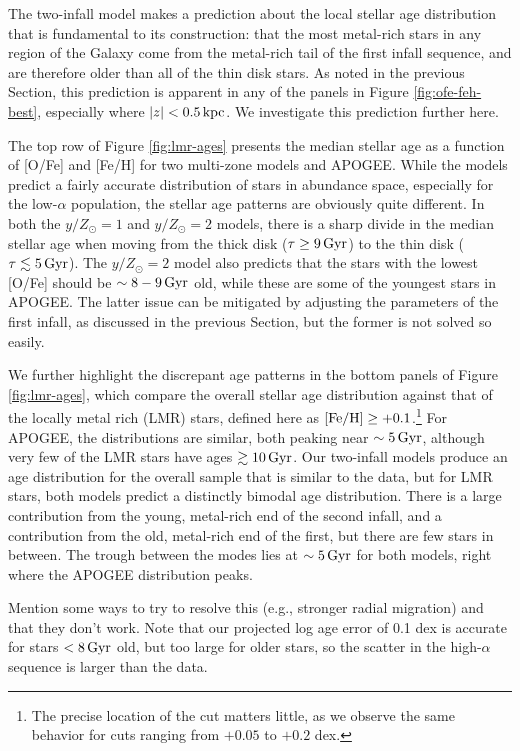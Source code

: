 \documentclass[twocolumn,twocolappendix,linenumbers]{aastex631}
\newcommand{\todo}[1]{{\color{red}#1}}
\newcommand{\mathFeH}{{\rm [Fe/H]}}
\newcommand{\yZ}[1]{$y/Z_\odot=#1$}
\newcommand{\kpc}{\,{\rm kpc}}
\newcommand{\Gyr}{\,{\rm Gyr}}
\begin{document}
The two-infall model makes a prediction about the local stellar age distribution that is fundamental to its construction: that the most metal-rich stars in any region of the Galaxy come from the metal-rich tail of the first infall sequence, and are therefore older than all of the thin disk stars. As noted in the previous Section, this prediction is apparent in any of the panels in Figure \ref{fig:ofe-feh-best}, especially where $|z|<0.5\kpc$. We investigate this prediction further here.

The top row of Figure \ref{fig:lmr-ages} presents the median stellar age as a function of [O/Fe] and [Fe/H] for two multi-zone models and APOGEE. While the models predict a fairly accurate distribution of stars in abundance space, especially for the low-$\alpha$ population, the stellar age patterns are obviously quite different. In both the \yZ{1} and \yZ{2} models, there is a sharp divide in the median stellar age when moving from the thick disk ($\tau\ge9\Gyr$) to the thin disk ($\tau\lesssim5\Gyr$). The \yZ{2} model also predicts that the stars with the lowest [O/Fe] should be $\sim8-9\Gyr$ old, while these are some of the youngest stars in APOGEE. The latter issue can be mitigated by adjusting the parameters of the first infall, as discussed in the previous Section, but the former is not solved so easily.

We further highlight the discrepant age patterns in the bottom panels of Figure \ref{fig:lmr-ages}, which compare the overall stellar age distribution against that of the locally metal rich (LMR) stars, defined here as $\mathFeH\ge+0.1$.\footnote{The precise location of the cut matters little, as we observe the same behavior for cuts ranging from $+0.05$ to $+0.2$ dex.} For APOGEE, the distributions are similar, both peaking near $\sim5\Gyr$, although very few of the LMR stars have ages $\gtrsim10\Gyr$. Our two-infall models produce an age distribution for the overall sample that is similar to the data, but for LMR stars, both models predict a distinctly bimodal age distribution. There is a large contribution from the young, metal-rich end of the second infall, and a contribution from the old, metal-rich end of the first, but there are few stars in between. The trough between the modes lies at $\sim5\Gyr$ for both models, right where the APOGEE distribution peaks.

\todo{Mention some ways to try to resolve this (e.g., stronger radial migration) and that they don't work.}
\todo{Note that our projected log age error of 0.1 dex is accurate for stars $<8\Gyr$ old, but too large for older stars, so the scatter in the high-$\alpha$ sequence is larger than the data.}
\end{document}
